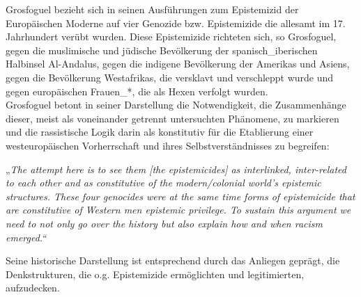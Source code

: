 Grosfoguel bezieht sich in seinen Ausführungen zum Epistemizid der Europäischen
Moderne auf vier Genozide bzw. Epistemizide die allesamt im 17. Jahrhundert
verübt wurden. Diese Epistemizide richteten sich, so Grosfoguel, gegen die
muslimische und jüdische Bevölkerung der spanisch\_iberischen Halbinsel
Al-Andalus, gegen die indigene Bevölkerung der Amerikas und Asiens, gegen die
Bevölkerung Westafrikas, die versklavt und verschleppt wurde und gegen
europäischen Frauen\_*, die als Hexen verfolgt wurden.\\
Grosfoguel betont in
seiner Darstellung die Notwendigkeit, die Zusammenhänge dieser, meist als
voneinander getrennt untersuchten Phänomene, zu markieren und die rassistische
Logik darin als konstitutiv für die Etablierung einer westeuropäischen
Vorherrschaft und ihres Selbstverständnisses zu begreifen: 
\begin{myenv}
  „\textit{The attempt here is to see them [the epistemicides] as interlinked,
 inter-related to each other and as constitutive of the modern/colonial world’s
 epistemic structures. These four genocides were at the same time forms of
 epistemicide that are constitutive of Western men epistemic privilege. To
 sustain this argument we need to not only go over the history but also explain
 how and when racism emerged.“\footnotemark}
\end{myenv}
 Seine historische Darstellung ist entsprechend durch das Anliegen geprägt, die
 Denkstrukturen, die o.g. Epistemizide ermöglichten und legitimierten,
 aufzudecken.\footnotemark {}\\

